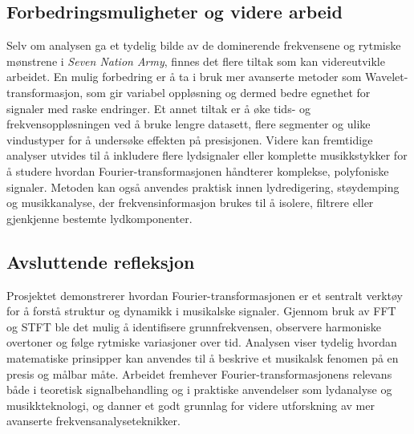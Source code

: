 \subsection{Forbedringsmuligheter og videre arbeid}
Selv om analysen ga et tydelig bilde av de dominerende frekvensene og rytmiske mønstrene 
i \textit{Seven Nation Army}, finnes det flere tiltak som kan videreutvikle arbeidet. 
En mulig forbedring er å ta i bruk mer avanserte metoder som Wavelet-transformasjon, 
som gir variabel oppløsning og dermed bedre egnethet for signaler med raske endringer. 
Et annet tiltak er å øke tids- og frekvensoppløsningen ved å bruke lengre datasett, 
flere segmenter og ulike vindustyper for å undersøke effekten på presisjonen. 
Videre kan fremtidige analyser utvides til å inkludere flere lydsignaler eller komplette musikkstykker 
for å studere hvordan Fourier-transformasjonen håndterer komplekse, polyfoniske signaler. 
Metoden kan også anvendes praktisk innen lydredigering, støydemping og musikkanalyse, 
der frekvensinformasjon brukes til å isolere, filtrere eller gjenkjenne bestemte lydkomponenter.

\subsection{Avsluttende refleksjon}
Prosjektet demonstrerer hvordan Fourier-transformasjonen er et sentralt verktøy for å forstå 
struktur og dynamikk i musikalske signaler. Gjennom bruk av FFT og STFT ble det mulig å identifisere 
grunnfrekvensen, observere harmoniske overtoner og følge rytmiske variasjoner over tid. 
Analysen viser tydelig hvordan matematiske prinsipper kan anvendes til å beskrive et musikalsk fenomen 
på en presis og målbar måte. Arbeidet fremhever Fourier-transformasjonens relevans både i teoretisk 
signalbehandling og i praktiske anvendelser som lydanalyse og musikkteknologi, og danner et godt grunnlag 
for videre utforskning av mer avanserte frekvensanalyseteknikker.

